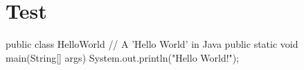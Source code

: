 \documentclass{article}
\begin{document}
{}
\section{Test}

\begin{myjava}
    public class HelloWorld {
        // A 'Hello World' in Java
        public static void main(String[] args) {
            System.out.println("Hello World!");
        }
    }
\end{myjava}

\end{document}
